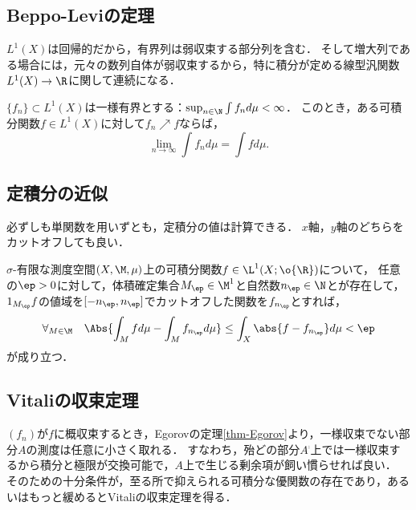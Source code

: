 \documentclass[uplatex, dvipdfmx]{jsreport}
\begin{document}
\subsection{Beppo-Leviの定理}

\begin{tcolorbox}[colframe=ForestGreen, colback=ForestGreen!10!white,breakable,colbacktitle=ForestGreen!40!white,coltitle=black,fonttitle=\bfseries\sffamily,
title=]
    $L^1(X)$は回帰的だから，有界列は弱収束する部分列を含む．
    そして増大列である場合には，元々の数列自体が弱収束するから，特に積分が定める線型汎関数$L^1(X)\to\R$に関して連続になる．
\end{tcolorbox}

\begin{theorem}
    $\{f_n\}\subset L^1(X)$は一様有界とする：$\sup_{n\in\N}\int f_nd\mu<\infty$．
    このとき，ある可積分関数$f\in L^1(X)$に対して$f_n\nearrow f$ならば，
    \[\lim_{n\to\infty}\int f_nd\mu=\int fd\mu.\]
\end{theorem}

\subsection{定積分の近似}

\begin{tcolorbox}[colframe=ForestGreen, colback=ForestGreen!10!white,breakable,colbacktitle=ForestGreen!40!white,coltitle=black,fonttitle=\bfseries\sffamily,
title=]
    必ずしも単関数を用いずとも，定積分の値は計算できる．
    $x$軸，$y$軸のどちらをカットオフしても良い．
\end{tcolorbox}

\begin{theorem}
    $\sigma$-有限な測度空間$(X,\M,\mu)$上の可積分関数$f\in\L^1(X;\o{\R})$について，
    任意の$\ep>0$に対して，体積確定集合$M_\ep\in\M^1$と自然数$n_\ep\in\N$とが存在して，
    $1_{M_\ep}f$の値域を$[-n_\ep,n_\ep]$でカットオフした関数を$f_{n_\ep}$とすれば，
    \[\forall_{M\in\M}\quad\Abs{\int_Mfd\mu-\int_Mf_{n_\ep}d\mu}\le\int_X\abs{f-f_{n_\ep}}d\mu<\ep\]
    が成り立つ．
\end{theorem}

\subsection{Vitaliの収束定理}\label{subsec-Vitali-convergence-theorem}

\begin{tcolorbox}[colframe=ForestGreen, colback=ForestGreen!10!white,breakable,colbacktitle=ForestGreen!40!white,coltitle=black,fonttitle=\bfseries\sffamily,
title=Lebesgueの優収束定理の描像と精緻化]
    $(f_n)$が$f$に概収束するとき，Egorovの定理\ref{thm-Egorov}より，一様収束でない部分$A$の測度は任意に小さく取れる．
    すなわち，殆どの部分$A^\comp$上では一様収束するから積分と極限が交換可能で，$A$上で生じる剰余項が飼い慣らせれば良い．
    そのための十分条件が，至る所で抑えられる可積分な優関数の存在であり，あるいはもっと緩めるとVitaliの収束定理を得る．
\end{tcolorbox}
\end{document}
